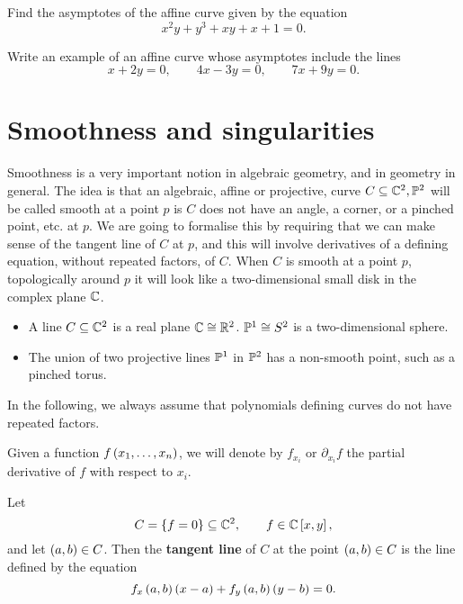 \begin{exercise}
Find the asymptotes of the affine curve given by the equation
$$ x^2y + y^3 + xy + x + 1 = 0. $$
\end{exercise}

\begin{exercise}
Write an example of an affine curve whose asymptotes include the lines
$$ x + 2y = 0, \qquad 4x - 3y = 0, \qquad 7x + 9y = 0. $$
\end{exercise}

\pagebreak

\section{Smoothness and singularities}


Smoothness is a very important notion in algebraic geometry, and in geometry in general. The idea is that an algebraic, affine or projective, curve $ C \subseteq \C^2, \P^2 $ will be called smooth at a point $ p $ is $ C $ does not have an angle, a corner, or a pinched point, etc. at $ p $. We are going to formalise this by requiring that we can make sense of the tangent line of $ C $ at $ p $, and this will involve derivatives of a defining equation, without repeated factors, of $ C $. When $ C $ is smooth at a point $ p $, topologically around $ p $ it will look like a two-dimensional small disk in the complex plane $ \C $.

\begin{example*}
\hfill
\begin{itemize}
\item A line $ C \subseteq \C^2 $ is a real plane $ \C \cong \R^2 $. $ \P^1 \cong S^2 $ is a two-dimensional sphere.
\item The union of two projective lines $ \P^1 $ in $ \P^2 $ has a non-smooth point, such as a pinched torus.
\end{itemize}
\end{example*}

In the following, we always assume that polynomials defining curves do not have repeated factors.

\begin{notation}
Given a function $ f\rb{x_1, \dots, x_n} $, we will denote by $ f_{x_i} $ or $ \partial_{x_i}f $ the partial derivative of $ f $ with respect to $ x_i $.
\end{notation}

Let
$$ C = \cb{f = 0} \subseteq \C^2, \qquad f \in \C\sb{x, y}, $$
and let $ \rb{a, b} \in C $. Then the \textbf{tangent line} of $ C $ at the point $ \rb{a, b} \in C $ is the line defined by the equation
$$ f_x\rb{a, b}\rb{x - a} + f_y\rb{a, b}\rb{y - b} = 0. $$

